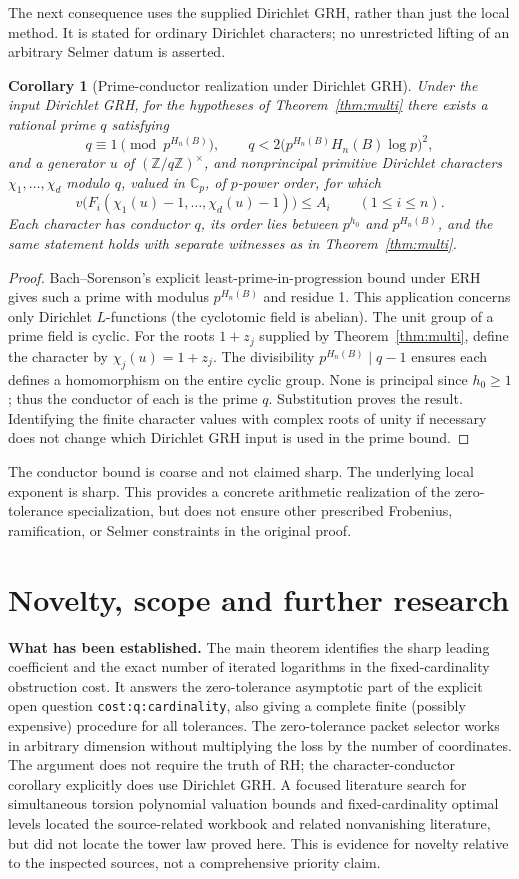 \documentclass[11pt]{article}
\newtheorem{corollary}[theorem]{Corollary}
\theoremstyle{remark}\newtheorem{remark}[theorem]{Remark}
\newcommand{\Cp}{\mathbb C_p}
\newcommand{\Z}{\mathbb Z}
\newcommand{\code}[1]{\texttt{#1}}
\begin{document}
The next consequence uses the supplied Dirichlet GRH, rather than just the local method. It is stated for ordinary Dirichlet characters; no unrestricted lifting of an arbitrary Selmer datum is asserted.
\begin{corollary}[Prime-conductor realization under Dirichlet GRH]\label{cor:characters}
Under the input Dirichlet GRH, for the hypotheses of Theorem~\ref{thm:multi} there exists a rational prime $q$ satisfying
\[
 q\equiv1\pmod{p^{H_n(B)}},\qquad q<2\bigl(p^{H_n(B)}H_n(B)\log p\bigr)^2,
\]
and a generator $u$ of $(\Z/q\Z)^\times$, and nonprincipal primitive Dirichlet characters $\chi_1,\ldots,\chi_d$ modulo $q$, valued in $\Cp$, of $p$-power order, for which
\[
 v\bigl(F_i(\chi_1(u)-1,\ldots,\chi_d(u)-1)\bigr)\le A_i\qquad(1\le i\le n).
\]
Each character has conductor $q$, its order lies between $p^{h_0}$ and $p^{H_n(B)}$, and the same statement holds with separate witnesses as in Theorem~\ref{thm:multi}.
\end{corollary}
\begin{proof}
Bach--Sorenson's explicit least-prime-in-progression bound under ERH \cite{bach} gives such a prime with modulus $p^{H_n(B)}$ and residue 1. This application concerns only Dirichlet $L$-functions (the cyclotomic field is abelian). The unit group of a prime field is cyclic. For the roots $1+z_j$ supplied by Theorem~\ref{thm:multi}, define the character by $\chi_j(u)=1+z_j$. The divisibility $p^{H_n(B)}\mid q-1$ ensures each defines a homomorphism on the entire cyclic group. None is principal since $h_0\ge1$; thus the conductor of each is the prime $q$. Substitution proves the result. Identifying the finite character values with complex roots of unity if necessary does not change which Dirichlet GRH input is used in the prime bound.
\end{proof}
The conductor bound is coarse and not claimed sharp. The underlying local exponent is sharp. This provides a concrete arithmetic realization of the zero-tolerance specialization, but does not ensure other prescribed Frobenius, ramification, or Selmer constraints in the original proof.

\section{Novelty, scope and further research}
\textbf{What has been established.} The main theorem identifies the sharp leading coefficient and the exact number of iterated logarithms in the fixed-cardinality obstruction cost. It answers the zero-tolerance asymptotic part of the explicit open question \code{cost:q:cardinality}, also giving a complete finite (possibly expensive) procedure for all tolerances. The zero-tolerance packet selector works in arbitrary dimension without multiplying the loss by the number of coordinates. The argument does not require the truth of RH; the character-conductor corollary explicitly does use Dirichlet GRH. A focused literature search for simultaneous torsion polynomial valuation bounds and fixed-cardinality optimal levels located the source-related workbook and related nonvanishing literature, but did not locate the tower law proved here. This is evidence for novelty relative to the inspected sources, not a comprehensive priority claim.
\end{document}
